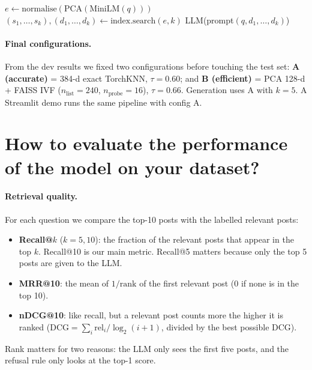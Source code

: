 \documentclass[11pt]{article}
\begin{document}
\begin{algorithm}[h]
\caption{Answer or refuse}
\label{alg:rag}
$e \leftarrow \text{normalise}(\text{PCA}(\text{MiniLM}(q)))$ 
$(s_1, \dots, s_k), (d_1, \dots, d_k) \leftarrow \text{index.search}(e, k)$ 
{\Return LLM(prompt$(q, d_1, \dots, d_k)$) }
\end{algorithm}

\paragraph{Final configurations.} From the dev results we fixed two configurations before touching the test set:
\textbf{A (accurate)} = 384-d exact TorchKNN, $\tau = 0.60$; and \textbf{B (efficient)} = PCA 128-d + FAISS IVF
($n_{\text{list}}=240$, $n_{\text{probe}}=16$), $\tau = 0.66$. Generation uses A with $k=5$. A Streamlit demo runs
the same pipeline with config A.

\section{How to evaluate the performance of the model on your dataset?}

\paragraph{Retrieval quality.} For each question we compare the top-10 posts with the labelled relevant posts:
\begin{itemize}[leftmargin=*]
\item \textbf{Recall@$k$} ($k = 5, 10$): the fraction of the relevant posts that appear in the top $k$. Recall@10 is
our main metric. Recall@5 matters because only the top 5 posts are given to the LLM.
\item \textbf{MRR@10}: the mean of $1/\text{rank}$ of the first relevant post (0 if none is in the top 10).
\item \textbf{nDCG@10}: like recall, but a relevant post counts more the higher it is ranked
($\text{DCG} = \sum_i \text{rel}_i / \log_2(i+1)$, divided by the best possible DCG).
\end{itemize}
Rank matters for two reasons: the LLM only sees the first five posts, and the refusal rule only looks at the
top-1 score.
\end{document}
